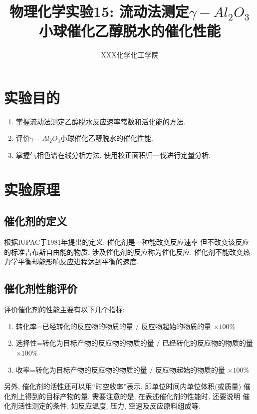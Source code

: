 \documentclass[a4paper]{article}
\title{物理化学实验15: 流动法测定$\gamma-Al_2O_3$小球催化乙醇脱水的催化性能}
\author{XXX\quad 123456789\quad 化学化工学院}
\begin{document}
\maketitle
\section{实验目的}
\begin{enumerate}
\item 掌握流动法测定乙醇脱水反应速率常数和活化能的方法.
\item 评价$\gamma - Al_{2}O_{3}$小球催化乙醇脱水的催化性能.
\item 掌握气相色谱在线分析方法, 使用校正面积归一伐进行定量分析.
\end{enumerate}


\section{实验原理}
\subsection{催化剂的定义}
根据IUPAC于1981年提出的定义: 催化剂是一种能改变反应速率
但不改变该反应的标准吉布斯自由能的物质. 涉及催化剂的反应称为催化反应. 
催化剂不能改变热力学平衡却能影响反应进程达到平衡的速度.
\subsection{催化剂性能评价}
评价催化剂的性能主要有以下几个指标:
\begin{enumerate}
\item 转化率=已经转化的反应物的物质的量 / 反应物起始的物质的量 $\times 100\%$
\item 选择性=转化为目标产物的反应物的物质的量 / 已经转化的反应物的物质的量 $\times 100\%$
\item 收率=转化为目标产物的反应物的物质的量 / 反应物起始的物质的量 $\times 100\%$
\end{enumerate}
\par
另外, 催化剂的活性还可以用``时空收率''表示, 即单位时间内单位体积(或质量)
催化剂上得到的目标产物的量. 需要注意的是, 在表述催化剂的性能时, 还要说明
催化剂活性测定的条件, 如反应温度, 压力, 空速及反应原料组成等.
\end{document}
